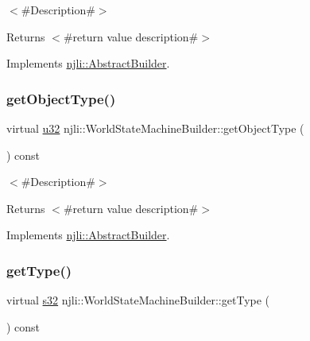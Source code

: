 $<$\#\+Description\#$>$

\begin{DoxyReturn}{Returns}
$<$\#return value description\#$>$ 
\end{DoxyReturn}


Implements \mbox{\hyperlink{classnjli_1_1_abstract_builder_a902f73ea78031b06aca183a417f3413b}{njli\+::\+Abstract\+Builder}}.

\mbox{\label{classnjli_1_1_world_state_machine_builder_adc1828ed4b64977e2c892fa1559e5f3d}} 
\subsubsection{\texorpdfstring{get\+Object\+Type()}{getObjectType()}}
{\footnotesize\ttfamily virtual \mbox{\hyperlink{_util_8h_a10e94b422ef0c20dcdec20d31a1f5049}{u32}} njli\+::\+World\+State\+Machine\+Builder\+::get\+Object\+Type (\begin{DoxyParamCaption}{ }\end{DoxyParamCaption}) const\hspace{0.3cm}{\ttfamily [virtual]}}

$<$\#\+Description\#$>$

\begin{DoxyReturn}{Returns}
$<$\#return value description\#$>$ 
\end{DoxyReturn}


Implements \mbox{\hyperlink{classnjli_1_1_abstract_builder_a0f2d344fcf697b167f4f2b1122b5fb33}{njli\+::\+Abstract\+Builder}}.

\mbox{\label{classnjli_1_1_world_state_machine_builder_a6e030fedf2c31bc287545aacc226dce8}} 
\subsubsection{\texorpdfstring{get\+Type()}{getType()}}
{\footnotesize\ttfamily virtual \mbox{\hyperlink{_util_8h_aa62c75d314a0d1f37f79c4b73b2292e2}{s32}} njli\+::\+World\+State\+Machine\+Builder\+::get\+Type (\begin{DoxyParamCaption}{ }\end{DoxyParamCaption}) const\hspace{0.3cm}{\ttfamily [virtual]}}

